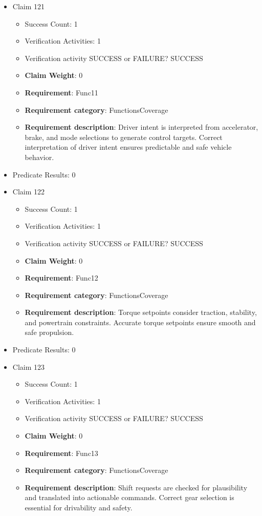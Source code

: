 \documentclass{article}
\begin{document}
\begin{itemize}
  				  \item Claim 121
				\begin{itemize}
			    	\item Success Count: 1 
			    	\item Verification Activities: 1
					\item Verification activity SUCCESS or FAILURE? SUCCESS
					\item \textbf{Claim Weight}: 0
						\item \textbf{Requirement}: Func11 
						\item \textbf{Requirement category}: FunctionsCoverage 
						\item \textbf{Requirement description}: Driver intent is interpreted from accelerator, brake, and mode selections to generate control targets. Correct interpretation of driver intent ensures predictable and safe vehicle behavior.
					
				\end{itemize}
				
									    
				\item Predicate Results: 0

  				  \item Claim 122
				\begin{itemize}
			    	\item Success Count: 1 
			    	\item Verification Activities: 1
					\item Verification activity SUCCESS or FAILURE? SUCCESS
					\item \textbf{Claim Weight}: 0
						\item \textbf{Requirement}: Func12 
						\item \textbf{Requirement category}: FunctionsCoverage 
						\item \textbf{Requirement description}: Torque setpoints consider traction, stability, and powertrain constraints. Accurate torque setpoints ensure smooth and safe propulsion.
					
				\end{itemize}
				
									    
				\item Predicate Results: 0

  				  \item Claim 123
				\begin{itemize}
			    	\item Success Count: 1 
			    	\item Verification Activities: 1
					\item Verification activity SUCCESS or FAILURE? SUCCESS
					\item \textbf{Claim Weight}: 0
						\item \textbf{Requirement}: Func13 
						\item \textbf{Requirement category}: FunctionsCoverage 
						\item \textbf{Requirement description}: Shift requests are checked for plausibility and translated into actionable commands. Correct gear selection is essential for drivability and safety.
					

\end{itemize}
\end{itemize}
\end{document}
